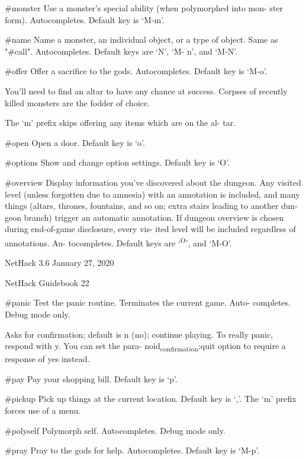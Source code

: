 \documentclass[11pt]{article}
\begin{document}
\#monster
   Use a monster's special ability (when polymorphed into mon-
   ster form). Autocompletes. Default key is `M-m'.

\#name
   Name a monster, an individual object, or a type of object.
   Same as "\#call". Autocompletes. Default keys are `N', `M-
   n', and `M-N'.

\#offer
   Offer a sacrifice to the gods. Autocompletes. Default key
   is `M-o'.

You'll need to find an altar to have any chance at success.
Corpses of recently killed monsters are the fodder of
choice.

The `m' prefix skips offering any items which are on the al-
tar.

\#open
   Open a door. Default key is `o'.

\#options
   Show and change option settings. Default key is `O'.

\#overview
   Display information you've discovered about the dungeon.
   Any visited level (unless forgotten due to amnesia) with an
   annotation is included, and many things (altars, thrones,
   fountains, and so on; extra stairs leading to another dun-
   geon branch) trigger an automatic annotation.  If dungeon
   overview is chosen during end-of-game disclosure, every vis-
   ited level will be included regardless of annotations.  Au-
   tocompletes. Default keys are `\textsuperscript{O}', and `M-O'.




NetHack 3.6                   January 27, 2020





NetHack Guidebook                       22



\#panic
   Test the panic routine. Terminates the current game. Auto-
   completes. Debug mode only.

Asks for confirmation; default is n (no); continue playing.
To really panic, respond with y. You can set the para-
noid\textsubscript{confirmation}:quit option to require a response of yes
instead.

\#pay
   Pay your shopping bill. Default key is `p'.

\#pickup
   Pick up things at the current location. Default key is `,'.
   The `m' prefix forces use of a menu.

\#polyself
   Polymorph self. Autocompletes. Debug mode only.

\#pray
   Pray to the gods for help. Autocompletes. Default key is
   `M-p'.
\end{document}
